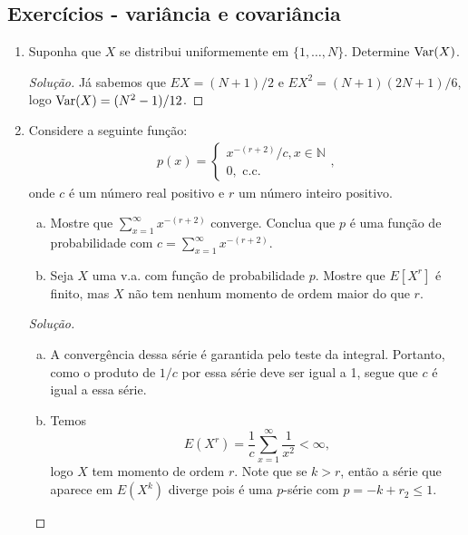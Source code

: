 \documentclass[../Notas.tex]{subfiles}
\begin{document}
\subsection{Exercícios - variância e covariância}

\begin{enumerate}
    \item Suponha que $X$ se distribui uniformemente em $\{1,\dots, N\}$. Determine $\text{Var}(X)$.
    \begin{proof}[Solução]
        Já sabemos que $EX = (N+1)/2$ e $EX^2 = (N+1)(2N+1)/6$, logo $\text{Var}(X) = (N^2 - 1)/12$.
    \end{proof}
    \item Considere a seguinte função:
    \begin{align*}
        p(x) = \begin{cases}
            x^{-(r+2)}/c, x\in\mathbb{N} \\
            0, \text{ c.c.}
        \end{cases},
    \end{align*}
    onde $c$ é um número real positivo e $r$ um número inteiro positivo.
    \begin{enumerate}[a)]
    \item Mostre que $\displaystyle{ \sum_{x=1}^{\infty} x^{-(r+2)} }$ converge. Conclua que $p$ é uma função de probabilidade com $c = \displaystyle{ \sum_{x=1}^{\infty} x^{-(r+2)} }$.
    \item Seja $X$ uma v.a. com função de probabilidade $p$. Mostre que $E[X^r]$ é finito, mas $X$ não tem nenhum momento de ordem maior do que $r$.
    \end{enumerate}
    \begin{proof}[Solução]
        \begin{enumerate}[a)]
            \item A convergência dessa série é garantida pelo teste da integral. Portanto, como
            o produto de $1/c$ por essa série deve ser igual a 1, segue que $c$ é igual a essa série.
            \item Temos
            \[
            E(X^r) = \frac{1}{c}\sum_{x=1}^{\infty} \frac{1}{x^2} < \infty,
            \]
            logo $X$ tem momento de ordem $r$. Note que se $k>r$, então a série que aparece em
            $E(X^k)$ diverge pois é uma $p$-série com $p = -k+r_2 \leq 1$.
        \end{enumerate}
    \end{proof}

\end{enumerate}
\end{document}
